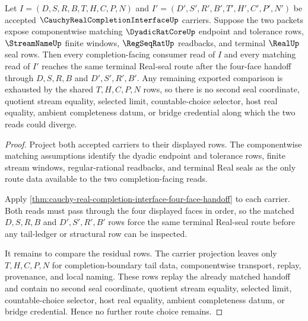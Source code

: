 \begin{theorem}
\label{thm:cauchy-real-completion-interface-real-seal-determinacy}
Let $I=(D,S,R,B,T,H,C,P,N)$ and $I'=(D',S',R',B',T',H',C',P',N')$ be accepted $\CauchyRealCompletionInterfaceUp$ carriers. Suppose the two packets expose componentwise matching $\DyadicRatCoreUp$ endpoint and tolerance rows, $\StreamNameUp$ finite windows, $\RegSeqRatUp$ readbacks, and terminal $\RealUp$ seal rows. Then every completion-facing consumer read of $I$ and every matching read of $I'$ reaches the same terminal Real-seal route after the four-face handoff through $D,S,R,B$ and $D',S',R',B'$. Any remaining exported comparison is exhausted by the shared $T,H,C,P,N$ rows, so there is no second seal coordinate, quotient stream equality, selected limit, countable-choice selector, host real equality, ambient completeness datum, or bridge credential along which the two reads could diverge.
\end{theorem}
\begin{proof}
Project both accepted carriers to their displayed rows. The componentwise matching assumptions identify the dyadic endpoint and tolerance rows, finite stream windows, regular-rational readbacks, and terminal Real seals as the only route data available to the two completion-facing reads.

Apply \autoref{thm:cauchy-real-completion-interface-four-face-handoff} to each carrier. Both reads must pass through the four displayed faces in order, so the matched $D,S,R,B$ and $D',S',R',B'$ rows force the same terminal Real-seal route before any tail-ledger or structural row can be inspected.

It remains to compare the residual rows. The carrier projection leaves only $T,H,C,P,N$ for completion-boundary tail data, componentwise transport, replay, provenance, and local naming. These rows replay the already matched handoff and contain no second seal coordinate, quotient stream equality, selected limit, countable-choice selector, host real equality, ambient completeness datum, or bridge credential. Hence no further route choice remains.
\end{proof}

